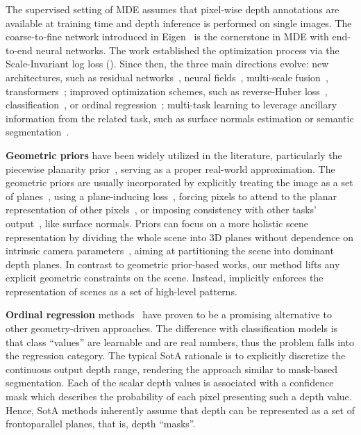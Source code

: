 The supervised setting of MDE assumes that pixel-wise depth annotations are available at training time and depth inference is performed on single images. The coarse-to-fine network introduced in Eigen~\etal\cite{Eigen2014} is the cornerstone in MDE with end-to-end neural networks. The work established the optimization process via the Scale-Invariant log loss (). Since then, the three main directions evolve: new architectures, such as residual networks~\cite{Laina2016}, neural fields~\cite{Liu2015, Xu2018}, multi-scale fusion~\cite{Lee2018, Miangoleh2021}, transformers~\cite{Yang2021, Bhat2020, Yuan2022}; improved optimization schemes, such as reverse-Huber loss~\cite{Laina2016}, classification~\cite{Cao2016}, or ordinal regression~\cite{Fu2018, Bhat2020}; multi-task learning to leverage ancillary information from the related task, such as surface normals estimation or semantic segmentation~\cite{Eigen2014, Qi2018, Xu2018tasks}.

\noindent{}\textbf{Geometric priors} have been widely utilized in the literature, particularly the piecewise planarity prior~\cite{Gallup2010, Chauve2010, Szomoru2014}, serving as a proper real-world approximation. The geometric priors are usually incorporated by explicitly treating the image as a set of planes~\cite{Liu2018PlaneNet, Liu2018PlaneRCNN, Yu2019, Li2021}, using a plane-inducing loss~\cite{Yu2020p2net}, forcing pixels to attend to the planar representation of other pixels~\cite{Lee2019, Patil2022}, or imposing consistency with other tasks' output~\cite{Yin2019, Long2021, Bae2022}, like surface normals. Priors can focus on a more holistic scene representation by dividing the whole scene into 3D planes without dependence on intrinsic camera parameters~\cite{Yang2018, Zhang2020}, aiming at partitioning the scene into dominant depth planes. In contrast to geometric prior-based works, our method lifts any explicit geometric constraints on the scene. Instead, \ourmodel implicitly enforces the representation of scenes as a set of high-level patterns.

\noindent{}\textbf{Ordinal regression} methods~\cite{Fu2018, Bhat2020, Bhat2022} have proven to be a promising alternative to other geometry-driven approaches. The difference with classification models is that class ``values'' are learnable and are real numbers, thus the problem falls into the regression category. The typical SotA rationale is to explicitly discretize the continuous output depth range, rendering the approach similar to mask-based segmentation. Each of the scalar depth values is associated with a confidence mask which describes the probability of each pixel presenting such a depth value. Hence, SotA methods inherently assume that depth can be represented as a set of frontoparallel planes, that is, depth ``masks''. 

